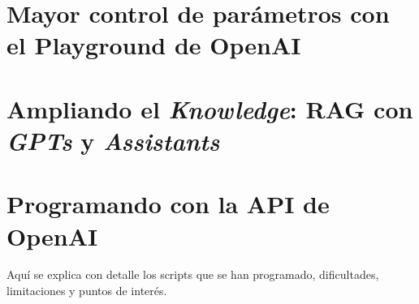 \section{Mayor control de parámetros con el Playground de OpenAI}

\section{Ampliando el \textit{Knowledge}: RAG con \textit{GPTs} y \textit{Assistants}}

\section{Programando con la API de OpenAI}
Aquí se explica con detalle los scripts que se han programado, dificultades, limitaciones y puntos de interés.






